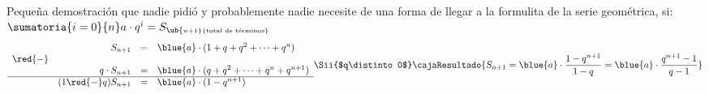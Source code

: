Pequeña demostración que nadie pidió y probablemente nadie necesite de una forma de llegar a la formulita de la serie geométrica, si:
$\sumatoria{i=0}{n} a \cdot q^i = S_{\ub{\scriptscriptstyle n+1}{\tiny\text{total de términos}}}$
$$
  \begin{array}{crcl}
            & S_{n+1}             & = & \blue{a} \cdot (1 + q + q^2 + \cdots + q^n)       \\
    \red{-} &                     &   &                                                   \\
            & q \cdot S_{n+1}     & = & \blue{a} \cdot (q + q^2 + \cdots + q^n + q^{n+1}) \\ \hline
            & (1\red{-} q)S_{n+1} & = & \blue{a} \cdot (1 - q^{n+1})                      \\
  \end{array}
  \Sii{$q\distinto 0$}
  \cajaResultado{
    S_{n+1} = \blue{a} \cdot \frac{1 - q^{n+1}}{1 - q} = \blue{a} \cdot \frac{q^{n+1} - 1}{q - 1}
  }
$$
